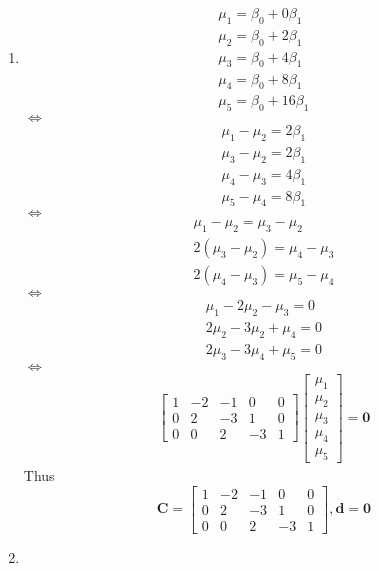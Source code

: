 \documentclass{article}
\begin{document}
\begin{enumerate}[leftmargin = 0 em, label = \arabic*., font = \bfseries]
\begin{enumerate}
	\item 
	\begin{align*}
	\mu_1 = \beta_0 + 0 \beta_1\\
	\mu_2 = \beta_0 + 2 \beta_1\\
	\mu_3 = \beta_0 + 4 \beta_1\\
	\mu_4 = \beta_0 + 8 \beta_1\\
	\mu_5 = \beta_0 + 16 \beta_1
	\end{align*}
	$\iff$
	\begin{align*}
	\mu_1 - \mu_2 = 2 \beta_1\\
	\mu_3 - \mu_2 = 2 \beta_1\\
	\mu_4 - \mu_3 = 4 \beta_1\\
	\mu_5 - \mu_4 = 8 \beta_1
	\end{align*}
	$\iff$
	\begin{align*}
	\mu_1 - \mu_2 = \mu_3 - \mu_2\\
	2(\mu_3 - \mu_2) = \mu_4 - \mu_3\\
	2 (\mu_4 - \mu_3) = \mu_5 - \mu_4
	\end{align*}
	$\iff$
	\begin{align*}
	\mu_1 - 2 \mu_2 - \mu_3 = 0\\
	2 \mu_2 - 3 \mu_2 + \mu_4 = 0\\
	2 \mu_3 - 3 \mu_4 + \mu_5 = 0
	\end{align*}
	$\iff$
	\begin{align*}
	\begin{bmatrix}
		1 & -2 & -1 & 0 & 0 \\
		0 & 2 & -3 & 1 & 0 \\
		0 & 0 & 2 & -3 & 1
	\end{bmatrix}\begin{bmatrix}
		\mu_1 \\
		\mu_2 \\
		\mu_3 \\
		\mu_4 \\
		\mu_5
	\end{bmatrix} = \bm 0
	\end{align*}
	Thus 
	\[\bm C = \begin{bmatrix}
		1 & -2 & -1 & 0 & 0 \\
		0 & 2 & -3 & 1 & 0 \\
		0 & 0 & 2 & -3 & 1
	\end{bmatrix}, \bm d = \bm 0\]

	\item 

	\ 


\end{enumerate}
\end{enumerate}
\end{document}
